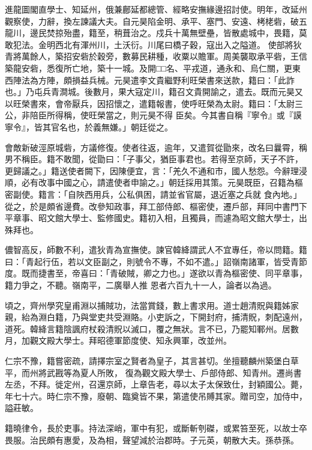 \begin{pinyinscope}
 進龍圖閣直學士、知延州，俄兼鄜延都總管、經略安撫緣邊招討使。明年，改延州觀察使，力辭，換左諫議大夫。自元昊陷金明、承平、塞門、安遠、栲栳砦，破五龍川，邊民焚掠殆盡，籍至，稍葺治之。戍兵十萬無壁壘，皆散處城中，畏籍，莫敢犯法。金明西北有渾州川，土沃衍。川尾曰橋子穀，寇出入之隘道。
 使部將狄青將萬餘人，築招安砦於穀旁，數募民耕種，收粟以贍軍。周美襲取承平砦，王信築龍安砦，悉復所亡地，築十一城。及開□□名、平戎道，通永和、烏仁關，更東西陣法為方陣，頗損益兵械。元昊遣李文貴繼野利旺榮書來送款，籍曰：「此詐也。」乃屯兵青澗城。後數月，果大寇定川，籍召文貴開諭之，遣去。既而元昊又以旺榮書來，會帝厭兵，因招懷之，遣籍報書，使呼旺榮為太尉。籍曰：「太尉三公，非陪臣所得稱，使旺榮當之，則元昊不得
 臣矣。今其書自稱『寧令』或『謨寧令』，皆其官名也，於義無嫌。」朝廷從之。



 會敵新破涇原城砦，方議修復。使者往返，逾年，又遣賀從勖來，改名曰曩霄，稱男不稱臣。籍不敢聞，從勖曰：「子事父，猶臣事君也。若得至京師，天子不許，更歸議之。」籍送使者闕下，因陳便宜，言：「羌久不通和市，國人愁怨。今辭理浸順，必有改事中國之心，請遣使者申諭之。」朝廷採用其策。元昊既臣，召籍為樞密副使。籍言：「自陜西用兵，公私俱困，請並省官屬，退近塞之兵就
 食內地。」從之，於是頗省邊費。改參知政事，拜工部侍郎、樞密使，遷戶部，拜同中書門下平章事、昭文館大學士、監修國史。籍初入相，且獨員，而遽為昭文館大學士，出殊拜也。



 儂智高反，師數不利，遣狄青為宣撫使。諫官韓絳謂武人不宜專任，帝以問籍。籍曰：「青起行伍，若以文臣副之，則號令不專，不如不遣。」詔嶺南諸軍，皆受青節度。既而捷書至，帝喜曰：「青破賊，卿之力也。」遂欲以青為樞密使、同平章事，籍力爭之，不聽。嶺南平，二廣舉人推
 恩者六百九十一人，論者以為過。



 頃之，齊州學究皇甫淵以捕賊功，法當賞錢，數上書求用。道士趙清貺與籍姊家親，紿為淵白籍，乃與堂吏共受淵賂。小吏訴之，下開封府，捕清貺，刺配遠州，道死。韓絳言籍陰諷府杖殺清貺以滅口，覆之無狀。言不已，乃罷知鄆州。居數月，加觀文殿大學士。拜昭德軍節度使、知永興軍，改並州。



 仁宗不豫，籍嘗密疏，請擇宗室之賢者為皇子，其言甚切。坐擅聽麟州築堡白草平，而州將武戡等為夏人所敗，
 復為觀文殿大學士、戶部侍郎、知青州。遷尚書左丞，不拜。徙定州，召還京師，上章告老，尋以太子太保致仕，封穎國公。薨，年七十六。時仁宗不豫，廢朝、臨奠皆不果，第遣使吊賻其家。贈司空，加侍中，謚莊敏。



 籍曉律令，長於吏事。持法深峭，軍中有犯，或斷斬刳磔，或累笞至死，以故士卒畏服。治民頗有惠愛，及為相，聲望減於治郡時。子元英，朝散大夫。孫恭孫。




\end{pinyinscope}
